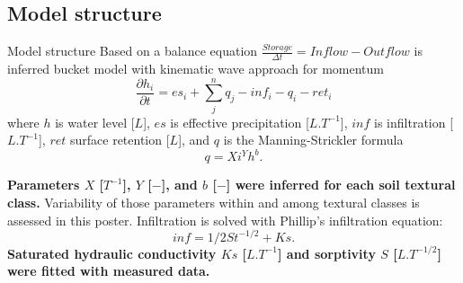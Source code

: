 \subsection{Model structure}
\begin{block}{Model structure}
    Based on a balance equation 
    $
        \frac{Storage}{\Delta t} = \nonumber  
        Inflow - Outflow
    $
    is inferred bucket model with kinematic wave approach for momentum 
    $$
        \frac{\partial h_{i}}{\partial t} =  es_{i} + \sum_j^n q_{j} - inf_{i} - q_{i} - ret_i
    $$
    where $h$ is water level [$L$], $es$ is effective precipitation [$L.T^{-1}$], $inf$ is infiltration [$L.T^{-1}$], $ret$ surface retention [$L$], and $q$ is the Manning-Strickler formula
    \begin{equation}
      q = Xi^Yh^b. 
      \label{eq:manning}
    \end{equation}

    {\bf Parameters $X$ [$T^{-1}$], $Y$ [$-$], and $b$ [$-$] were inferred for each soil textural class.} Variability of those parameters within and among textural classes is assessed in this poster. Infiltration is solved with Phillip's infiltration equation:
    \begin{equation}
      inf = 1/2St^{-1/2} + Ks.
      \label{eq:Phillips}
    \end{equation}
    {\bf Saturated hydraulic conductivity $Ks$ [$L.T^{-1}$] and sorptivity $S$ [$L.T^{-1/2}$] were fitted with measured data.}
\end{block}



